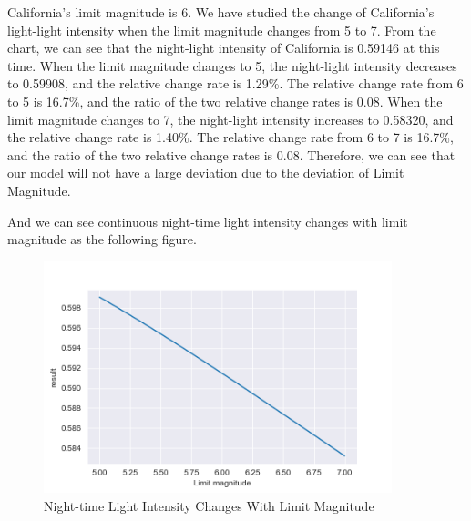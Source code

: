 California's limit magnitude is 6. We have studied the change of California's light-light intensity when the limit magnitude changes from 5 to 7. From the chart, we can see that the night-light intensity of California is 0.59146 at this time. When the limit magnitude changes to 5, the night-light intensity decreases to 0.59908, and the relative change rate is 1.29\%. The relative change rate from 6 to 5 is 16.7\%, and the ratio of the two relative change rates is 0.08. When the limit magnitude changes to 7, the night-light intensity increases to 0.58320, and the relative change rate is 1.40\%. The relative change rate from 6 to 7 is 16.7\%, and the ratio of the two relative change rates is 0.08. Therefore, we can see that our model will not have a large deviation due to the deviation of Limit Magnitude.

And we can see continuous night-time light intensity changes with limit magnitude as the following figure.
\begin{figure}[H]\centering
    \includegraphics[width=0.9\textwidth]{figures/Limit_magnitude.png}
    \caption{Night-time Light Intensity Changes With Limit Magnitude} \label{fig:figure8}
\end{figure}